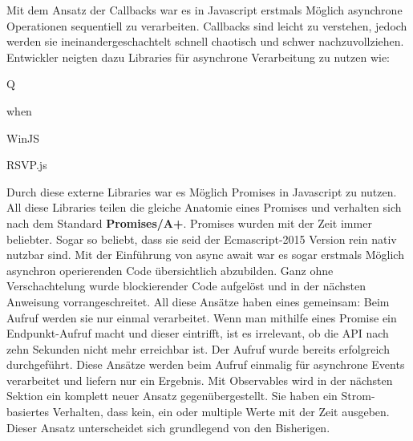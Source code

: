 Mit dem Ansatz der Callbacks war es in Javascript erstmals Möglich asynchrone Operationen sequentiell zu verarbeiten. Callbacks sind leicht zu verstehen, jedoch werden sie ineinandergeschachtelt schnell chaotisch und schwer nachzuvollziehen. Entwickler neigten dazu Libraries für asynchrone Verarbeitung zu nutzen wie:

\begin{description}
\item Q
\item when
\item WinJS
\item RSVP.js
\end{description}

\noindent
Durch diese externe Libraries war es Möglich Promises in Javascript zu nutzen. All diese Libraries teilen die gleiche Anatomie eines Promises und verhalten sich nach dem Standard \textbf{Promises/A+}.\cite{promises-a+} Promises wurden mit der Zeit immer beliebter. Sogar so beliebt, dass sie seid der Ecmascript-2015 Version rein nativ nutzbar sind. Mit der Einführung von async await war es sogar erstmals Möglich asynchron operierenden Code übersichtlich abzubilden. Ganz ohne Verschachtelung wurde blockierender Code aufgelöst und in der nächsten Anweisung vorrangeschreitet. All diese Ansätze haben eines gemeinsam: Beim Aufruf werden sie nur einmal verarbeitet. Wenn man mithilfe eines Promise ein Endpunkt-Aufruf macht und dieser eintrifft, ist es irrelevant, ob die API nach zehn Sekunden nicht mehr erreichbar ist. Der Aufruf wurde bereits erfolgreich durchgeführt. Diese Ansätze werden beim Aufruf einmalig für asynchrone Events verarbeitet und liefern nur ein Ergebnis. Mit Observables wird in der nächsten Sektion ein komplett neuer Ansatz gegenübergestellt. Sie haben ein Strom-basiertes Verhalten, dass kein, ein oder multiple Werte mit der Zeit ausgeben. Dieser Ansatz unterscheidet sich grundlegend von den Bisherigen.
